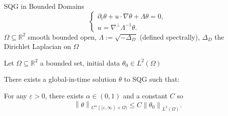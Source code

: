 \documentclass{beamer}
\newcommand{\R}{\mathbb{R}}
\newcommand{\eps}{\varepsilon}
\newcommand{\norm}[1]{\left\lVert#1\right\rVert}
\newcommand{\del}{\partial}
\newcommand{\grad}{\nabla}
\newcommand{\Laplace}{\Delta}
\begin{document}
\begin{frame}{SQG in Bounded Domains}
\begin{equation*}\begin{cases}
\del_t \theta + u \cdot \grad \theta + \Lambda \theta = 0, \\
u = \grad^\perp \Lambda^{-1} \theta.
\end{cases} \end{equation*}
$\Omega \subseteq \R^2$ smooth bounded open, $\Lambda := \sqrt{-\Laplace_D}$ (defined spectrally), $\Laplace_D$ the Dirichlet Laplacian on $\Omega$

\begin{theorem}[S., Vasseur [ARMA, '20{]}]
Let $\Omega \subseteq \R^2$ a bounded set, initial data $\theta_0 \in L^2(\Omega)$

There exists a global-in-time solution $\theta$ to SQG such that:

For any $\eps > 0$, there exists $\alpha \in (0,1)$ and a constant $C$ so
\[ \norm{\theta}_{C^\alpha([\eps,\infty)\times\Omega)} \leq C \norm{\theta_0}_{L^2(\Omega)}. \]
\end{theorem}

\end{frame}


%

\end{document}

